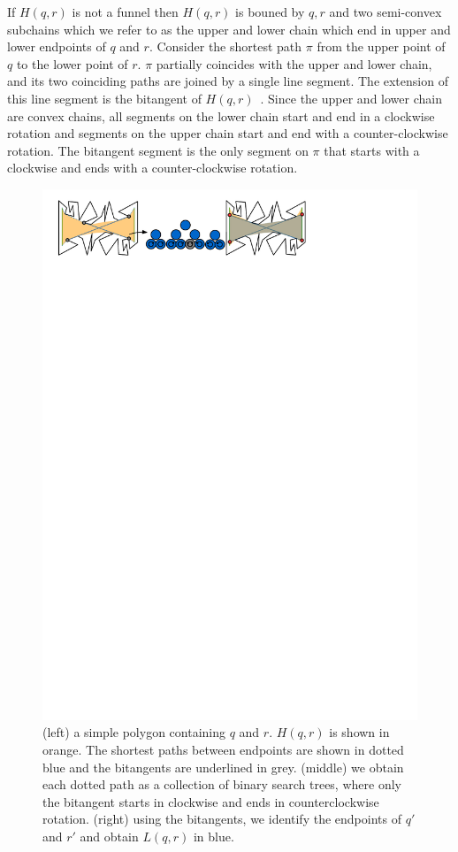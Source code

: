\documentclass[a4paper, UKenglish]{paper}
\begin{document}
If $H(q,r)$ is not a funnel then $H(q,r)$ is bouned by $q, r$ and two semi-convex subchains which we refer to as the upper and lower chain which end in upper and lower endpoints of $q$ and $r$. Consider the shortest path $\pi$ from the upper point of $q$ to the lower point of $r$. $\pi$ partially coincides with the upper and lower chain, and its two coinciding paths are joined by a single line segment. The extension of this line segment is the bitangent of $H(q,r)$~\cite{FRANK}. Since the upper and lower chain are convex chains, all segments on the lower chain start and end in a clockwise rotation and segments on the upper chain start and end with a counter-clockwise rotation. The bitangent segment is the only segment on $\pi$ that starts with a clockwise and ends with a counter-clockwise rotation. 


\begin{figure}[h]
    \centering
    \includegraphics[]{../visibilityglass}
    \caption{(left) a simple polygon containing $q$ and $r$. $H(q,r)$ is shown in orange. The shortest paths between endpoints are shown in dotted blue and the bitangents are underlined in grey. (middle) we obtain each dotted path as a collection of binary search trees, where only the bitangent starts in clockwise and ends in counterclockwise rotation. (right) using the bitangents, we identify the endpoints of $q'$ and $r'$ and obtain $L(q,r)$ in blue. }
    \label{fig:visibilityglass}
\end{figure}
\end{document}
